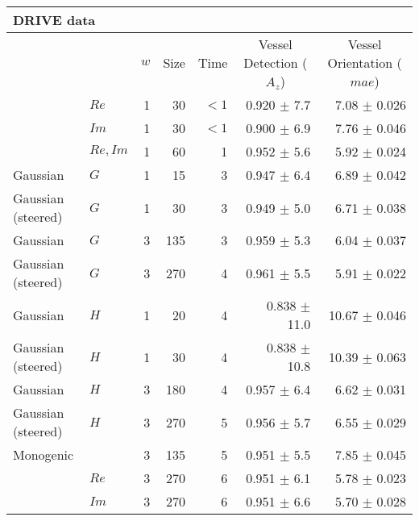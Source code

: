 \begin{tabularx}{\linewidth}{p{3cm} p{3cm} r r r r r}
\toprule
\multicolumn{7}{l}{DRIVE data} \\
\midrule
            &
            & $w$
            & Size
            & Time
            & \multicolumn{1}{c}{Vessel Detection \linebreak ($A_z$)}
            & \multicolumn{1}{c}{Vessel Orientation \linebreak ($mae$)}  \\
\dtcwt{}& $Re$                      & 1 &     30    &${<}1$  & 0.920 $\pm$ 7.7   &  7.08 $\pm$ 0.026  \\
\dtcwt{}& $Im$                      & 1 &     30    &${<}1$  & 0.900 $\pm$ 6.9   &  7.76 $\pm$ 0.046 \\
\dtcwt{}& $Re,Im$                   & 1 &     60    &  1     & 0.952 $\pm$ 5.6   &  5.92 $\pm$ 0.024 \\

Gaussian& $G$                       & 1 &     15    &  3     & 0.947 $\pm$ 6.4 & 6.89 $\pm$ 0.042   \\
Gaussian (steered)& $G$             & 1 &     30    &  3     & 0.949 $\pm$ 5.0   & 6.71 $\pm$ 0.038 \\
Gaussian& $G$                       & 3 &    135    &  3     & 0.959 $\pm$ 5.3 & 6.04 $\pm$ 0.037 \\
Gaussian (steered)& $G$             & 3 &    270    &  4     & 0.961 $\pm$ 5.5   & 5.91 $\pm$ 0.022 \\
Gaussian& $H$                       & 1 &     20    &  4     & 0.838 $\pm$ 11.0& 10.67 $\pm$ 0.046  \\
Gaussian (steered)& $H$             & 1 &     30    &  4     & 0.838 $\pm$ 10.8   & 10.39 $\pm$ 0.063\\
Gaussian& $H$                       & 3 &    180    &  4     & 0.957 $\pm$ 6.4 & 6.62 $\pm$ 0.031 \\
Gaussian (steered)& $H$             & 3 &    270    &  5     & 0.956 $\pm$ 5.7   & 6.55 $\pm$ 0.029 \\

\multicolumn{2}{l}{Monogenic}       & 3 &    135    &  5     & 0.951 $\pm$ 5.5     & 7.85 $\pm$ 0.045 \\

\dtcwt{}& $Re$                      & 3 &    270    &  6     & 0.951 $\pm$ 6.1   & 5.78 $\pm$ 0.023 \\
\dtcwt{}& $Im$                      & 3 &    270    &  6     & 0.951 $\pm$ 6.6   & 5.70 $\pm$ 0.028 \\


\end{tabularx}
